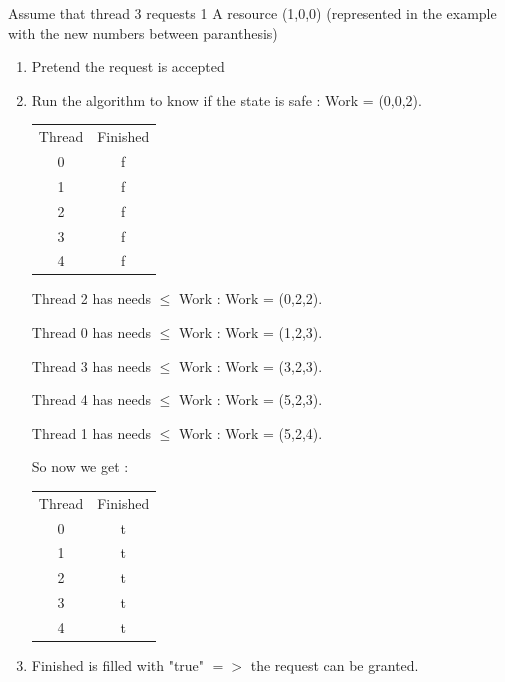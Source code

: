\documentclass[a4paper,10pt]{article}
\begin{document}
Assume that thread 3 requests 1 A resource (1,0,0) (represented in the example with the new numbers between paranthesis)
\begin{enumerate}
  \item Pretend the request is accepted
  \item Run the algorithm to know if the state is safe : Work = (0,0,2). 

  \begin{center}
    \begin{tabular}{cc}
      Thread & Finished\\
      0 & f\\
      1 & f\\
      2 & f\\
      3 & f\\
      4 & f\\
    \end{tabular}
  \end{center}

Thread 2 has needs $\leq$ Work  : Work = (0,2,2).

Thread 0 has needs $\leq$ Work : Work = (1,2,3).

Thread 3 has needs $\leq$ Work : Work = (3,2,3).

Thread 4 has needs $\leq$ Work : Work = (5,2,3).

Thread 1 has needs $\leq$ Work : Work = (5,2,4).

So now we get :

\begin{center}
    \begin{tabular}{cc}
      Thread & Finished\\
      0 & t\\
      1 & t\\
      2 & t\\
      3 & t\\
      4 & t\\
    \end{tabular}
  \end{center}

\item Finished is filled with "true" $=>$ the request can be granted.
\end{enumerate}
\end{document}
